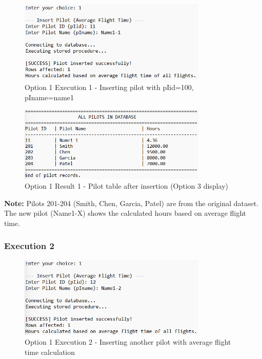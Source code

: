 \documentclass[12pt]{article}
\begin{document}
\begin{figure}[h]
\centering
\includegraphics[width=0.8\textwidth]{../../../Screenshots/Problem1/Option1/Option1-1.png}
\caption{Option 1 Execution 1 - Inserting pilot with pIid=100, pIname=name1}
\label{fig:option1_exec1}
\end{figure}

\begin{figure}[h]
\centering
\includegraphics[width=0.8\textwidth]{../../../Screenshots/Problem1/Option1/Option1-1_result.png}
\caption{Option 1 Result 1 - Pilot table after insertion (Option 3 display)}
\label{fig:option1_result1}
\end{figure}

\textbf{Note:} Pilots 201-204 (Smith, Chen, Garcia, Patel) are from the original dataset. The new pilot (Name1-X) shows the calculated hours based on average flight time.

\newpage
\subsubsection{Execution 2}

\begin{figure}[h]
\centering
\includegraphics[width=0.8\textwidth]{../../../Screenshots/Problem1/Option1/Option1-2.png}
\caption{Option 1 Execution 2 - Inserting another pilot with average flight time calculation}
\label{fig:option1_exec2}
\end{figure}
\end{document}
